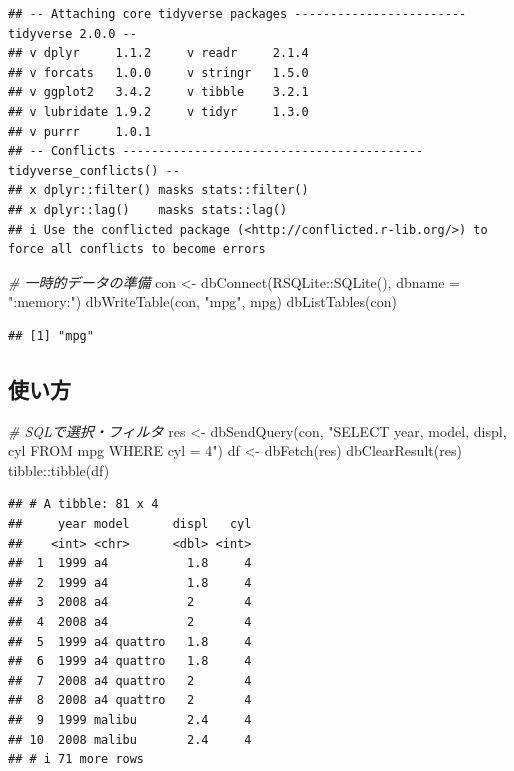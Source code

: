 \documentclass[
]{article}
\newenvironment{Shaded}{\begin{snugshade}}{\end{snugshade}}
\newcommand{\AttributeTok}[1]{\textcolor[rgb]{0.77,0.63,0.00}{#1}}
\newcommand{\CommentTok}[1]{\textcolor[rgb]{0.56,0.35,0.01}{\textit{#1}}}
\newcommand{\FunctionTok}[1]{\textcolor[rgb]{0.00,0.00,0.00}{#1}}
\newcommand{\NormalTok}[1]{#1}
\newcommand{\OtherTok}[1]{\textcolor[rgb]{0.56,0.35,0.01}{#1}}
\newcommand{\SpecialCharTok}[1]{\textcolor[rgb]{0.00,0.00,0.00}{#1}}
\newcommand{\StringTok}[1]{\textcolor[rgb]{0.31,0.60,0.02}{#1}}
\begin{document}
\begin{verbatim}
## -- Attaching core tidyverse packages ------------------------ tidyverse 2.0.0 --
## v dplyr     1.1.2     v readr     2.1.4
## v forcats   1.0.0     v stringr   1.5.0
## v ggplot2   3.4.2     v tibble    3.2.1
## v lubridate 1.9.2     v tidyr     1.3.0
## v purrr     1.0.1     
## -- Conflicts ------------------------------------------ tidyverse_conflicts() --
## x dplyr::filter() masks stats::filter()
## x dplyr::lag()    masks stats::lag()
## i Use the conflicted package (<http://conflicted.r-lib.org/>) to force all conflicts to become errors
\end{verbatim}

\begin{Shaded}
\begin{Highlighting}[]
  \CommentTok{\# 一時的データの準備}
\NormalTok{con }\OtherTok{\textless{}{-}} \FunctionTok{dbConnect}\NormalTok{(RSQLite}\SpecialCharTok{::}\FunctionTok{SQLite}\NormalTok{(), }\AttributeTok{dbname =} \StringTok{":memory:"}\NormalTok{)}
\FunctionTok{dbWriteTable}\NormalTok{(con, }\StringTok{"mpg"}\NormalTok{, mpg)}
\FunctionTok{dbListTables}\NormalTok{(con)}
\end{Highlighting}
\end{Shaded}

\begin{verbatim}
## [1] "mpg"
\end{verbatim}

\hypertarget{ux4f7fux3044ux65b9-6}{%
\subsection{使い方}\label{ux4f7fux3044ux65b9-6}}

\begin{Shaded}
\begin{Highlighting}[]
  \CommentTok{\# SQLで選択・フィルタ}
\NormalTok{res }\OtherTok{\textless{}{-}} \FunctionTok{dbSendQuery}\NormalTok{(con, }\StringTok{"SELECT year, model, displ, cyl FROM mpg WHERE cyl = 4"}\NormalTok{)}
\NormalTok{df }\OtherTok{\textless{}{-}} \FunctionTok{dbFetch}\NormalTok{(res)}
\FunctionTok{dbClearResult}\NormalTok{(res)}
\NormalTok{tibble}\SpecialCharTok{::}\FunctionTok{tibble}\NormalTok{(df)}
\end{Highlighting}
\end{Shaded}

\begin{verbatim}
## # A tibble: 81 x 4
##     year model      displ   cyl
##    <int> <chr>      <dbl> <int>
##  1  1999 a4           1.8     4
##  2  1999 a4           1.8     4
##  3  2008 a4           2       4
##  4  2008 a4           2       4
##  5  1999 a4 quattro   1.8     4
##  6  1999 a4 quattro   1.8     4
##  7  2008 a4 quattro   2       4
##  8  2008 a4 quattro   2       4
##  9  1999 malibu       2.4     4
## 10  2008 malibu       2.4     4
## # i 71 more rows
\end{verbatim}
\end{document}
